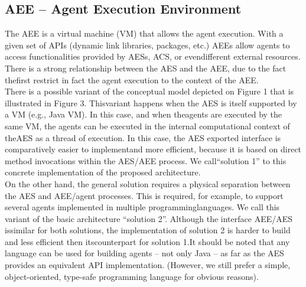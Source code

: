 \documentclass{article}
\begin{document}
 \subsection{AEE – Agent Execution Environment}
 The AEE is a virtual machine (VM) that allows the agent execution. With a given set of APIs (dynamic link libraries, packages, etc.) AEEs allow agents to access functionalities provided by AESs, ACS, or evendifferent external resources. There is a strong relationship between the AES and the AEE, due to the fact thefirst restrict in fact the agent execution to the context of the AEE.\\There is a possible variant of the conceptual model depicted on Figure 1 that is illustrated in Figure 3. Thisvariant happens when the AES is itself supported by a VM (e.g., Java VM). In this case, and when theagents are executed by the same VM, the agents can be executed in the internal computational context of theAES as a thread of execution. In this case, the AES exported interface is comparatively easier to implementand more efficient, because it is based on direct method invocations within the AES/AEE process. We call“solution 1” to this concrete implementation of the proposed architecture.\\
 On the other hand, the general solution requires a physical separation between the AES and AEE/agent processes. This is required, for example, to support several agents implemented in multiple programminglanguages. We call this variant of the basic architecture “solution 2”. Although the interface AEE/AES issimilar for both solutions, the implementation of solution 2 is harder to build and less efficient then itscounterpart for solution 1.It should be noted that any language can be used for building agents – not only Java – as far as the AES provides an equivalent API implementation. (However, we still prefer a simple, object-oriented, type-safe programming language for obvious reasons).
\end{document}
